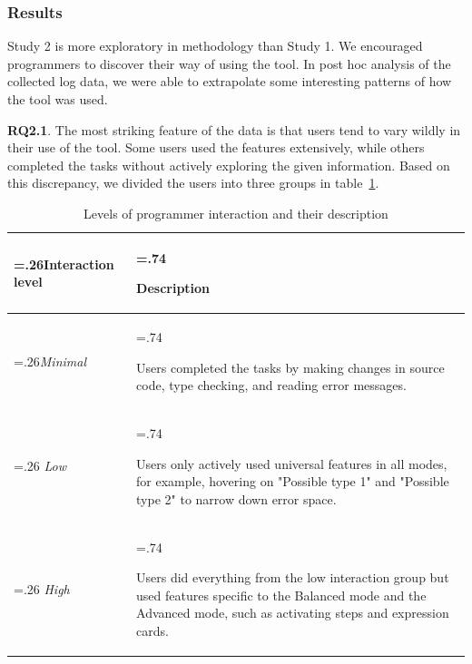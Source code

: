 \subsubsection*{\textbf{Results}} 

Study 2 is more exploratory in methodology than Study 1. We encouraged programmers  to discover their way of using the tool. In post hoc analysis of the collected log data, we were able to extrapolate some interesting patterns of how the tool was used. 


\textbf{RQ2.1}. The most striking feature of the data is that users tend to vary wildly in their use of the tool. Some users used the features extensively, while others completed the tasks without actively exploring the given information. Based on this discrepancy, we divided the users into three groups in table~\ref{tab:interaction-level}.
\begin{table}
    \centering
\begin{scriptsize}
\begin{small}
\noindent\begin{tabularx}{\linewidth}{ 
  | >{\hsize=.26\hsize}X 
  | >{\hsize=.74\hsize \raggedright\arraybackslash}X  | }
    \hline
        Interaction level & Description \\ \hline
        \textit{Minimal}  & Users completed the tasks by making changes in source code, type checking, and reading error messages. \\ \hline
        \textit{Low}  & Users only actively used universal features in all modes, for example, hovering on "Possible type 1" and "Possible type 2" to narrow down error space. \\ \hline
        \textit{High}  & Users did everything from the low interaction group but used features specific to the Balanced mode and the Advanced mode, such as activating steps and expression cards. \\ \hline
\end{tabularx}
\end{small}
\end{scriptsize}
    \caption{Levels of programmer interaction and their description}
    \label {tab:interaction-level}
\end{table}

